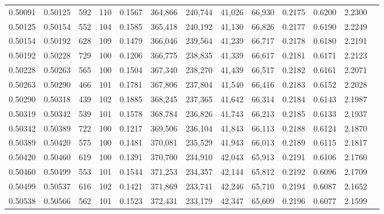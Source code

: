 \begin{tabular}{rrrrrrrrrrrrr}
0.50091 & 0.50125 &   592 & 110 &                                     0.1567 & 364,866 & 240,744 &  41,026 &  66,930 & 0.2175 & 0.6200 & 2.2300 \\
0.50125 & 0.50154 &   552 & 104 &                                     0.1585 & 365,418 & 240,192 &  41,130 &  66,826 & 0.2177 & 0.6190 & 2.2249 \\
0.50154 & 0.50192 &   628 & 109 &                                     0.1479 & 366,046 & 239,564 &  41,239 &  66,717 & 0.2178 & 0.6180 & 2.2191 \\
0.50192 & 0.50228 &   729 & 100 &                                     0.1206 & 366,775 & 238,835 &  41,339 &  66,617 & 0.2181 & 0.6171 & 2.2123 \\
0.50228 & 0.50263 &   565 & 100 &                                     0.1504 & 367,340 & 238,270 &  41,439 &  66,517 & 0.2182 & 0.6161 & 2.2071 \\
0.50263 & 0.50290 &   466 & 101 &                                     0.1781 & 367,806 & 237,804 &  41,540 &  66,416 & 0.2183 & 0.6152 & 2.2028 \\
0.50290 & 0.50318 &   439 & 102 &                                     0.1885 & 368,245 & 237,365 &  41,642 &  66,314 & 0.2184 & 0.6143 & 2.1987 \\
0.50319 & 0.50342 &   539 & 101 &                                     0.1578 & 368,784 & 236,826 &  41,743 &  66,213 & 0.2185 & 0.6133 & 2.1937 \\
0.50342 & 0.50389 &   722 & 100 &                                     0.1217 & 369,506 & 236,104 &  41,843 &  66,113 & 0.2188 & 0.6124 & 2.1870 \\
0.50389 & 0.50420 &   575 & 100 &                                     0.1481 & 370,081 & 235,529 &  41,943 &  66,013 & 0.2189 & 0.6115 & 2.1817 \\
0.50420 & 0.50460 &   619 & 100 &                                     0.1391 & 370,700 & 234,910 &  42,043 &  65,913 & 0.2191 & 0.6106 & 2.1760 \\
0.50460 & 0.50499 &   553 & 101 &                                     0.1544 & 371,253 & 234,357 &  42,144 &  65,812 & 0.2192 & 0.6096 & 2.1709 \\
0.50499 & 0.50537 &   616 & 102 &                                     0.1421 & 371,869 & 233,741 &  42,246 &  65,710 & 0.2194 & 0.6087 & 2.1652 \\
0.50538 & 0.50566 &   562 & 101 &                                     0.1523 & 372,431 & 233,179 &  42,347 &  65,609 & 0.2196 & 0.6077 & 2.1599 \\

\end{tabular}
